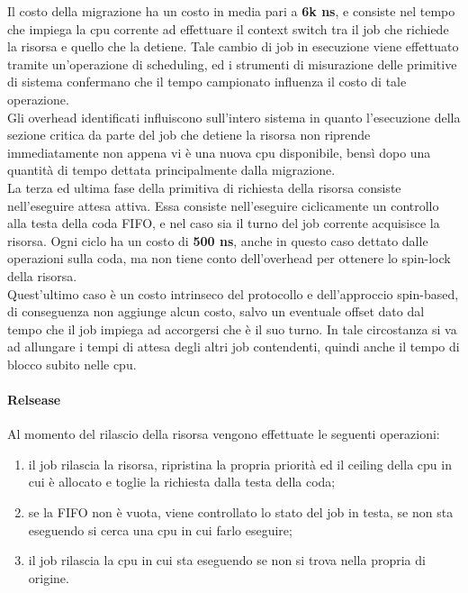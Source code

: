 \noindent Il costo della migrazione ha un costo in media pari a \textbf{6k ns}, e consiste nel tempo che impiega la cpu corrente ad effettuare il context switch tra il job che richiede la risorsa e quello che la detiene. Tale cambio di job in esecuzione viene effettuato tramite un'operazione di scheduling, ed i strumenti di misurazione delle primitive di sistema confermano che il tempo campionato influenza il costo di tale operazione.\\

\noindent Gli overhead identificati influiscono sull'intero sistema in quanto l'esecuzione della sezione critica da parte del job che detiene la risorsa non riprende immediatamente non appena vi è una nuova cpu disponibile, bensì dopo una quantità di tempo dettata principalmente dalla migrazione.\\

\noindent La terza ed ultima fase della primitiva di richiesta della risorsa consiste nell'eseguire attesa attiva. Essa consiste nell'eseguire ciclicamente un controllo alla testa della coda FIFO, e nel caso sia il turno del job corrente acquisisce la risorsa. Ogni ciclo ha un costo di \textbf{500 ns}, anche in questo caso dettato dalle operazioni sulla coda, ma non tiene conto dell'overhead per ottenere lo spin-lock della risorsa.\\

\noindent Quest'ultimo caso è un costo intrinseco del protocollo e dell'approccio spin-based, di conseguenza non aggiunge alcun costo, salvo un eventuale offset dato dal tempo che il job impiega ad accorgersi che è il suo turno. In tale circostanza si va ad allungare i tempi di attesa degli altri job contendenti, quindi anche il tempo di blocco subito nelle cpu.\\

\paragraph{Relsease} Al momento del rilascio della risorsa vengono effettuate le seguenti operazioni:

\begin{enumerate}
	\item il job rilascia la risorsa, ripristina la propria priorità ed il ceiling della cpu in cui è allocato e toglie la richiesta dalla testa della coda;
	\item se la FIFO non è vuota, viene controllato lo stato del job in testa, se non sta eseguendo si cerca una cpu in cui farlo eseguire;
	\item il job rilascia la cpu in cui sta eseguendo se non si trova nella propria di origine.
\end{enumerate}

